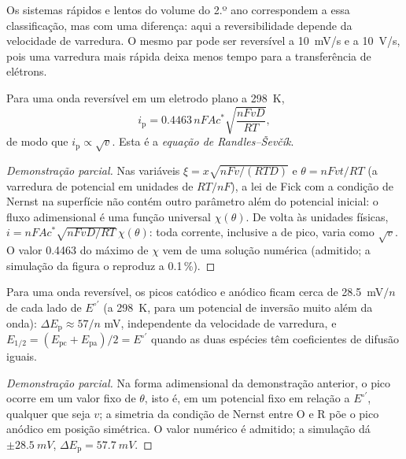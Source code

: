 \begin{remark}
Os sistemas rápidos e lentos do volume do 2.º ano correspondem a essa
classificação, mas com uma diferença: aqui a reversibilidade depende da velocidade
de varredura. O mesmo par pode ser reversível a \qty{10}{mV/s} e  a
\qty{10}{V/s}, pois uma varredura mais rápida deixa menos tempo para a transferência
de elétrons.
\end{remark}

\begin{proposition}\label{prop:b3:electrode-kinetics:randles-sevcik}
Para uma onda reversível em um eletrodo plano a \qty{298}{K},
\[
  i_{\mathrm p} = 0.4463\,nFAc^*\sqrt{\frac{nFvD}{RT}},
\]
de modo que $i_{\mathrm p} \propto \sqrt v$. Esta é a \emph{equação de Randles--Ševčík}.
\end{proposition}

\begin{proof}[Demonstração parcial]
Nas variáveis $\xi = x\sqrt{nFv/(RTD)}$ e $\theta = nFvt/RT$ (a varredura de potencial em unidades de
$RT/nF$), a lei de Fick com a condição de Nernst na superfície não contém outro
parâmetro além do potencial inicial: o fluxo adimensional é uma função universal
$\chi(\theta)$. De volta às unidades físicas, $i = nFAc^*\sqrt{nFvD/RT}\,\chi(\theta)$: toda
corrente, inclusive a de pico, varia como $\sqrt v$. O valor 0.4463 do máximo de
$\chi$ vem de uma solução numérica (admitido; a simulação da figura o reproduz a
0.1\,\%).
\end{proof}

\begin{proposition}\label{prop:b3:electrode-kinetics:delta-ep}
Para uma onda reversível, os picos catódico e anódico ficam cerca de \qty{28.5}{mV}$/n$
de cada lado de $E^{\circ\prime}$ (a \qty{298}{K}, para um potencial de inversão muito além da onda):
$\Delta E_{\mathrm p} \approx 57/n$ mV, independente da velocidade de varredura, e $E_{1/2} = (E_{\mathrm{pc}} + E_{\mathrm{pa}})/2 =
E^{\circ\prime}$ quando as duas espécies têm coeficientes de difusão iguais.
\end{proposition}

\begin{proof}[Demonstração parcial]
Na forma adimensional da demonstração anterior, o pico ocorre em um valor fixo de
$\theta$, isto é, em um potencial fixo em relação a $E^{\circ\prime}$, qualquer que seja $v$; a
simetria da condição de Nernst entre O e R põe o pico anódico em posição
simétrica. O valor numérico é admitido; a simulação dá
$\pm\qty{28.5}{mV}$, $\Delta E_{\mathrm p} = \qty{57.7}{mV}$.
\end{proof}

